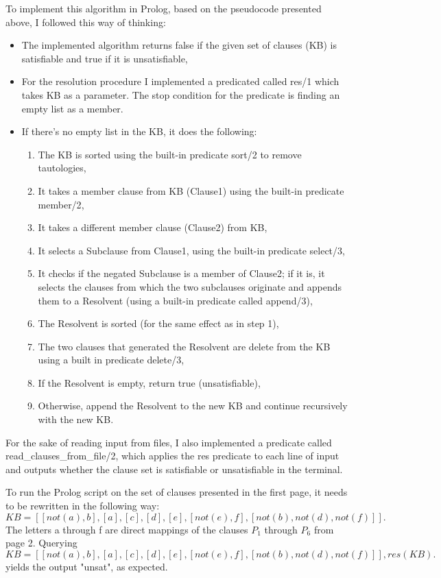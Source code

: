 \documentclass{article}
\begin{document}
To implement this algorithm in Prolog, based on the pseudocode presented above, I followed this way of thinking:
\begin{itemize}
	\item The implemented algorithm returns false if the given set of clauses (KB) is satisfiable and true if it is unsatisfiable,
	\item For the resolution procedure I implemented a predicated called res/1 which takes KB as a parameter. The stop condition for the predicate is finding an empty list as a member.
	\item If there's no empty list in the KB, it does the following:
		\begin{enumerate}
			\item The KB is sorted using the built-in predicate sort/2\cite{sortpred} to remove tautologies,
			\item It takes a member clause from KB (Clause1) using the built-in predicate member/2\cite{memberpred},
			\item It takes a different member clause (Clause2) from KB,
			\item It selects a Subclause from Clause1, using the built-in predicate select/3\cite{selectpred},
			\item It checks if the negated Subclause is a member of Clause2; if it is, it selects the clauses from which the two subclauses originate and appends them to a Resolvent (using a built-in predicate called append/3\cite{appendpred}),
			\item The Resolvent is sorted (for the same effect as in step 1),
			\item The two clauses that generated the Resolvent are delete from the KB using a built in predicate delete/3\cite{deletepred},
			\item If the Resolvent is empty, return true (unsatisfiable),
			\item Otherwise, append the Resolvent to the new KB and continue recursively with the new KB.
		\end{enumerate}
\end{itemize}

For the sake of reading input from files, I also implemented a predicate called read\_clauses\_from\_file/2, which applies the res predicate to each line of input and outputs whether the clause set is satisfiable or unsatisfiable in the terminal.

To run the Prolog script on the set of clauses presented in the first page, it needs to be rewritten in the following way:
$$
KB=[[not(a), b], [a], [c], [d], [e], [not(e), f], [not(b), not(d), not(f)]].
$$
The letters a through f are direct mappings of the clauses $P_1$ through $P_6$ from page 2. Querying 
$$
KB=[[not(a), b], [a], [c], [d], [e], [not(e), f], [not(b), not(d), not(f)]], res(KB).
$$
yields the output "unsat", as expected.
\end{document}
